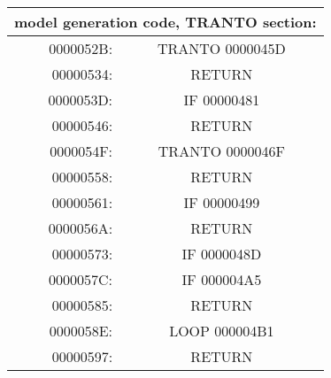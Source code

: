 \begin{center}\begin{tabular}{|r|c|}
\hline
\multicolumn{2}{|c|}{model generation code, TRANTO section:} \\
\hline
0000052B: & TRANTO 0000045D \\
00000534: & RETURN \\
\hline
0000053D: & IF 00000481 \\
00000546: & RETURN \\
\hline
0000054F: & TRANTO 0000046F \\
00000558: & RETURN \\
\hline
00000561: & IF 00000499 \\
0000056A: & RETURN \\
\hline
00000573: & IF 0000048D \\
0000057C: & IF 000004A5 \\
00000585: & RETURN \\
\hline
0000058E: & LOOP 000004B1 \\
00000597: & RETURN \\
\hline
\end{tabular}\end{center}
